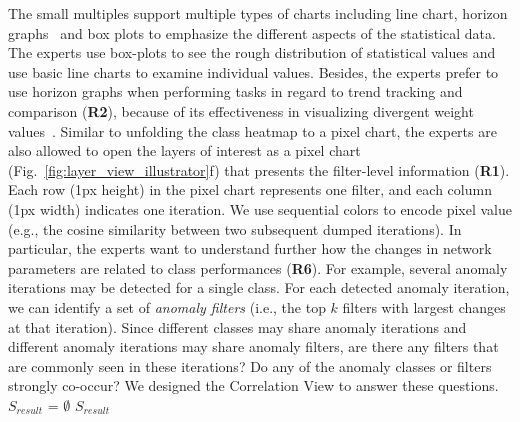 \documentclass[format=acmsmall, review=false, screen=true]{acmart}
\begin{document}
The small multiples support multiple types of charts including line chart, horizon graphs~\cite{heer2010tour} and box plots to emphasize the different aspects of the statistical data.
The experts use box-plots to see the rough distribution of statistical values and use basic line charts to examine individual values. Besides, the experts prefer to use horizon graphs when performing tasks in regard to trend tracking and comparison (\textbf{R2}), because of its effectiveness in visualizing divergent weight values~\cite{javed2010graphical}.
Similar to unfolding the class heatmap to a pixel chart, the experts are also allowed to open the layers of interest as a pixel chart (Fig.~\ref{fig:layer_view_illustrator}f) that presents the filter-level information (\textbf{R1}). Each row (1px height) in the pixel chart represents one filter, and each column (1px width) indicates one iteration. We use sequential colors to encode pixel value (e.g., the cosine similarity between two subsequent dumped iterations).
In particular, the experts want to understand further how the changes in network parameters are related to class performances (\textbf{R6}).
For example, several anomaly iterations may be detected for a single class.
For each detected anomaly iteration, we can identify a set of \textit{anomaly filters} (i.e., the top $k$ filters with largest changes at that iteration).
Since different classes may share anomaly iterations and different anomaly iterations may share anomaly filters, are there any filters that are commonly seen in these iterations?
Do any of the anomaly classes or filters strongly co-occur?
We designed the Correlation View to answer these questions.
	\SetAlgoNoLine
	$S_{result}$ = $\emptyset$\;
	 $S_{result}$ \label{alg:setsplit:return}
\end{document}
